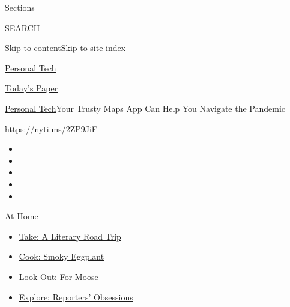 Sections

SEARCH

\protect\hyperlink{site-content}{Skip to
content}\protect\hyperlink{site-index}{Skip to site index}

\href{https://www.nytimes3xbfgragh.onion/section/technology/personaltech}{Personal
Tech}

\href{https://myaccount.nytimes3xbfgragh.onion/auth/login?response_type=cookie\&client_id=vi}{}

\href{https://www.nytimes3xbfgragh.onion/section/todayspaper}{Today's
Paper}

\href{/section/technology/personaltech}{Personal Tech}\textbar{}Your
Trusty Maps App Can Help You Navigate the Pandemic

\href{https://nyti.ms/2ZP9JiF}{https://nyti.ms/2ZP9JiF}

\begin{itemize}
\item
\item
\item
\item
\item
\end{itemize}

\href{https://www.nytimes3xbfgragh.onion/spotlight/at-home?action=click\&pgtype=Article\&state=default\&region=TOP_BANNER\&context=at_home_menu}{At
Home}

\begin{itemize}
\tightlist
\item
  \href{https://www.nytimes3xbfgragh.onion/2020/07/28/books/time-for-a-literary-road-trip.html?action=click\&pgtype=Article\&state=default\&region=TOP_BANNER\&context=at_home_menu}{Take:
  A Literary Road Trip}
\item
  \href{https://www.nytimes3xbfgragh.onion/2020/07/29/magazine/bored-with-your-home-cooking-some-smoky-eggplant-will-fix-that.html?action=click\&pgtype=Article\&state=default\&region=TOP_BANNER\&context=at_home_menu}{Cook:
  Smoky Eggplant}
\item
  \href{https://www.nytimes3xbfgragh.onion/2020/07/27/travel/moose-michigan-isle-royale.html?action=click\&pgtype=Article\&state=default\&region=TOP_BANNER\&context=at_home_menu}{Look
  Out: For Moose}
\item
  \href{https://www.nytimes3xbfgragh.onion/interactive/2020/at-home/even-more-reporters-editors-diaries-lists-recommendations.html?action=click\&pgtype=Article\&state=default\&region=TOP_BANNER\&context=at_home_menu}{Explore:
  Reporters' Obsessions}
\end{itemize}

